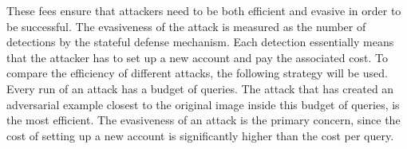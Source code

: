 These fees ensure that attackers need to be both efficient and evasive in order to be successful. The evasiveness of the attack is measured as the number of detections by the stateful defense mechanism. Each detection essentially means that the attacker has to set up a new account and pay the associated cost. To compare the efficiency of different attacks, the following strategy will be used. Every run of an attack has a budget of queries. The attack that has created an adversarial example closest to the original image inside this budget of queries, is the most efficient. The evasiveness of an attack is the primary concern, since the cost of setting up a new account is significantly higher than the cost per query.

